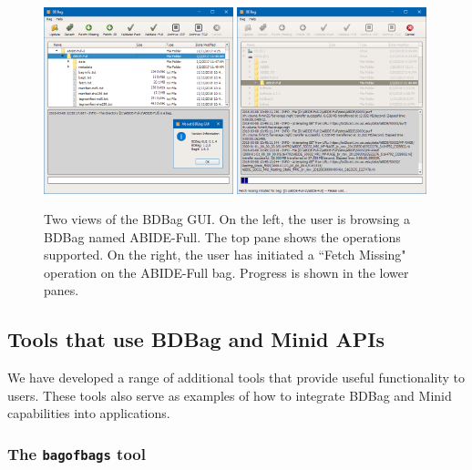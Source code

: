 \documentclass[11pt]{article}
\begin{document}
\begin{figure}[h]

\centering
\includegraphics[width=0.49\textwidth]{figs/bdbag_gui_version.png}
\includegraphics[width=0.49\textwidth]{figs/bdbag_gui_fetch.png}
\caption{Two views of the BDBag GUI. 
On the left, the user is browsing a BDBag named ABIDE-Full. The top pane shows the operations
supported. On the right, the user has initiated a ``Fetch Missing" operation on the ABIDE-Full
bag. Progress is shown in the lower panes.\label{fig:gui}}
\end{figure}



\subsection{Tools that use BDBag and Minid APIs}

We have developed a range of additional tools that provide useful functionality to users.
These tools also serve as examples of how to integrate BDBag and Minid
capabilities into applications.

\subsubsection{The \texttt{bagofbags} tool}
\end{document}
